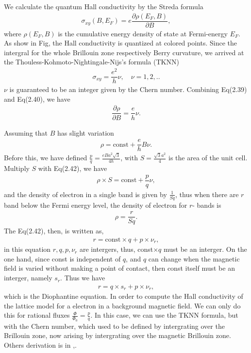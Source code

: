 \documentclass{report}
\newcommand{\f}[2]{\dfrac{#1}{#2}}
\begin{document}
We calculate the quantum Hall conductivity by the Streda formula \cite{streda1982}
\begin{gather}
	\sigma_{xy}(B,E_{F}) = e \f{\partial \rho (E_{F},B)}{\partial B},
\end{gather}
where $\rho(E_{F},B)$ is the cumulative energy density of state at Fermi-energy $E_{F}$. As show in Fig, the Hall conductivity is quantized at colored points. Since the intergral for the whole Brillouin zone respectively Berry curvature, we arrived at the Thouless-Kohmoto-Nightingale-Nijs's formula (TKNN)
\begin{gather}
	\sigma_{xy} = \f{e^{2}}{h} \nu, \quad \nu = 1,2,..
\end{gather}
$\nu$ is guaranteed to be an integer given by the Chern number. Combining Eq(2.39) and Eq(2.40), we have
\begin{gather}
	\f{\partial \rho}{\partial B} = \f{e}{h} \nu.
\end{gather}

Assuming that $B$ has slight variation
\begin{gather}
	\rho = \text{const} + \f{e}{h}B \nu.
\end{gather}
Before this, we have defined $\frac{p}{q} = \frac{eBa^{2}\sqrt{3}}{4h}$, with $S = \frac{\sqrt{3} a^{2}}{4}$ is the area of the unit cell. Multiply $S$ with Eq(2.42), we have
\begin{gather}
	\rho \times S = \text{const} + \f{p}{q} \nu,
\end{gather}
and the density of electron in a single band is given by $\frac{1}{Sq}$, thus when there are $r$ band below the Fermi energy level, the density of electron for $r$-{} bands is
\begin{gather}
	\rho = \f{r}{Sq}.
\end{gather}
The Eq(2.42), then, is written as,
\begin{gather}
	r = \text{const} \times q + p \times \nu_{r},
\end{gather}
in this equation $r,q,p,\nu_{r}$ are intergers, thus, const$\times q$ must be an interger. On the one hand, since const is independent of $q$, and $q$ can change when the magnetic field is varied without making a point of contact, then const itself must be an interger, namely $s_{r}$. Thus we have
\begin{gather}
	r = q \times s_{r} + p \times \nu_{r},
\end{gather}
which is the Diophantine equation. In order to compute the Hall conductivity of the lattice model for a electron in a background magnetic field. We can only do this for rational fluxes $\frac{\Phi}{\Phi_{0}} = \frac{p}{q}$. In this case, we can use the TKNN formula, but with the Chern number, which used to be defined by intergrating over the Brillouin zone, now arising by intergrating over the magnetic Brillouin zone. Others derivation is in \cite{di2022linking},\cite{dana1985}.
\end{document}

